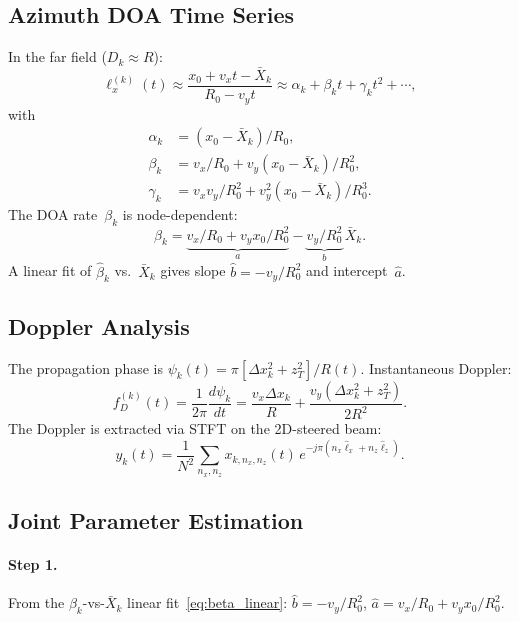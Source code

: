 \documentclass[11pt,a4paper]{article}
\begin{document}
\subsection{Azimuth DOA Time Series}
\label{sec:doa_time}

In the far field ($D_k\approx R$):
\begin{equation}
  \ell_x^{(k)}(t)\approx
  \frac{x_0+v_x t-\bar{X}_k}{R_0-v_y t}
  \approx\alpha_k+\beta_k t+\gamma_k t^2+\cdots,
  \label{eq:lx_taylor}
\end{equation}
with
\begin{align}
  \alpha_k &= (x_0{-}\bar{X}_k)/R_0,
  \label{eq:alpha}\\
  \beta_k &= v_x/R_0 + v_y(x_0{-}\bar{X}_k)/R_0^2,
  \label{eq:beta}\\
  \gamma_k &= v_xv_y/R_0^2 + v_y^2(x_0{-}\bar{X}_k)/R_0^3.
  \label{eq:gamma}
\end{align}
The DOA rate~$\beta_k$ is node-dependent:
\begin{equation}
  \beta_k = \underbrace{v_x/R_0+v_yx_0/R_0^2}_{a}
  -\underbrace{v_y/R_0^2}_{b}\,\bar{X}_k.
  \label{eq:beta_linear}
\end{equation}
A linear fit of $\hat{\beta}_k$ vs.\ $\bar{X}_k$ gives slope
$\hat{b}=-v_y/R_0^2$ and intercept~$\hat{a}$.

\subsection{Doppler Analysis}
\label{sec:doppler}

The propagation phase is
$\psi_k(t)=\pi[\Delta x_k^2+z_T^2]/R(t)$.  Instantaneous Doppler:
\begin{equation}
  f_D^{(k)}(t)=\frac{1}{2\pi}\frac{d\psi_k}{dt}
  =\frac{v_x\Delta x_k}{R}
  +\frac{v_y(\Delta x_k^2+z_T^2)}{2R^2}.
  \label{eq:doppler}
\end{equation}
The Doppler is extracted via STFT on the 2D-steered beam:
\begin{equation}
  y_k(t)=\frac{1}{N^2}\sum_{n_x,n_z}
  x_{k,n_x,n_z}(t)\,
  e^{-j\pi(n_x\hat{\ell}_x+n_z\hat{\ell}_z)}.
  \label{eq:steered}
\end{equation}

\subsection{Joint Parameter Estimation}
\label{sec:joint_b}

\paragraph{Step 1.}
From the $\beta_k$-vs-$\bar{X}_k$ linear
fit~\eqref{eq:beta_linear}:
$\hat{b}=-v_y/R_0^2$, $\hat{a}=v_x/R_0+v_yx_0/R_0^2$.
\end{document}
